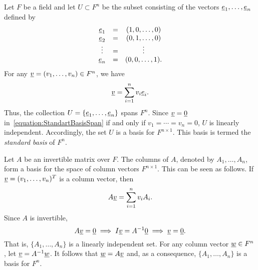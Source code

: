 \begin{example}
Let $F$ be a field and let $U \subset F^n$ be the subset consisting of the vectors $\underline{e}_1, \ldots, \underline{e}_n$ defined by
\begin{equation*}
\begin{array}{ccc}
\underline{e}_1 & = & (1, 0, \ldots, 0) \\
\underline{e}_2 & = & (0, 1, \ldots, 0) \\
\vdots & = & \vdots \\
\underline{e}_n & = & (0, 0, \ldots, 1).
\end{array}
\end{equation*}
For any $\underline{v} = (v_1, \ldots, v_n) \in F^n$, we have
\begin{equation} \label{equation:StandartBasisSpan}
\underline{v} = \sum_{i=1}^n v_i \underline{e}_i.
\end{equation}
Thus, the collection $U = \left\{ \underline{e}_1, \ldots, \underline{e}_n \right\}$ spans $F^n$.
Since $\underline{v} = \underline{0}$ in~\eqref{equation:StandartBasisSpan} if and only if $v_1 = \cdots = v_n = 0$, $U$ is linearly independent.
Accordingly, the set $U$ is a basis for $F^{n \times 1}$.
This basis is termed the \emph{standard basis} of $F^n$.
\end{example}

\begin{example}
Let $A$ be an invertible matrix over $F$.
The columns of $A$, denoted by $A_1, \ldots, A_n$, form a basis for the space of column vectors $F^{n \times 1}$.
This can be seen as follows.
If $\underline{v} = (v_1, \ldots, v_n)^T$ is a column vector, then
\begin{equation*}
A \underline{v} = \sum_{i=1}^n v_i A_i.
\end{equation*}
Since $A$ is invertible,
\begin{equation*}
A \underline{v} = \underline{0} \implies I \underline{v} = A^{-1} \underline{0} \implies \underline{v} = \underline{0}.
\end{equation*}
That is, $\{ A_1, \ldots, A_n \}$ is a linearly independent set.
For any column vector $\underline{w} \in F^n$, let $\underline{v} = A^{-1} \underline{w}$.
It follows that $\underline{w} = A \underline{v}$ and, as a consequence, $\{ A_1, \ldots, A_n \}$ is a basis for $F^n$.
\end{example}

